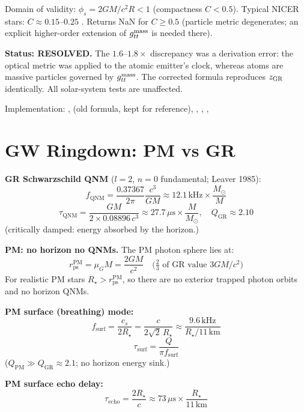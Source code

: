 \documentclass[10pt,twocolumn]{article}
\begin{document}
Domain of validity: $\phi_s = 2GM/c^2 R < 1$ (compactness $C < 0.5$).
Typical NICER stars: $C \approx 0.15$--$0.25$ \checkmark.
Returns NaN for $C \geq 0.5$ (particle metric degenerates; an explicit
higher-order extension of $g_{tt}^{\rm mass}$ is needed there).

\textbf{Status: RESOLVED.}
The $1.6$--$1.8\times$ discrepancy was a derivation error: the optical
metric was applied to the atomic emitter's clock, whereas atoms are
massive particles governed by $g_{tt}^{\rm mass}$.
The corrected formula reproduces $z_{\rm GR}$ identically.
All solar-system tests are unaffected.

Implementation: ,
 (old formula, kept for reference),
,
,
,

\section{GW Ringdown: PM vs GR}

\textbf{GR Schwarzschild QNM} ($l{=}2$, $n{=}0$ fundamental; Leaver 1985):
\[
  f_{\mathrm{QNM}} = \frac{0.37367}{2\pi}\frac{c^3}{GM}
  \approx 12.1\,\mathrm{kHz}\times\frac{M_\odot}{M}
\]
\[
  \tau_{\mathrm{QNM}} = \frac{GM}{2\times0.08896\,c^3}
  \approx 27.7\,\mu\mathrm{s}\times\frac{M}{M_\odot},
  \quad
  Q_{\mathrm{GR}} \approx 2.10
\]
(critically damped: energy absorbed by the horizon.)

\textbf{PM: no horizon \textrightarrow{} no QNMs.}
The PM photon sphere lies at:
\[
  r_{\mathrm{ps}}^{\mathrm{PM}} = \mu_G M = \frac{2GM}{c^2}
  \quad\bigl(\tfrac{2}{3}\text{ of GR value }3GM/c^2\bigr)
\]
For realistic PM stars $R_\star > r_{\mathrm{ps}}^{\mathrm{PM}}$, so there are
no exterior trapped photon orbits and no horizon QNMs.

\textbf{PM surface (breathing) mode:}
\[
  f_{\mathrm{surf}} = \frac{c_s}{2R_\star} = \frac{c}{2\sqrt{2}\,R_\star}
  \approx\frac{9.6\,\mathrm{kHz}}{R_{\star}/\mathrm{11\,km}}
\]
\[
  \tau_{\mathrm{surf}} = \frac{Q}{\pi f_{\mathrm{surf}}}
\]
($Q_{\mathrm{PM}} \gg Q_{\mathrm{GR}}\approx 2.1$; no horizon energy sink.)

\textbf{PM surface echo delay:}
\[
  \tau_{\mathrm{echo}} = \frac{2R_\star}{c}
  \approx 73\,\mu\mathrm{s}\times\frac{R_\star}{11\,\mathrm{km}}
\]
\end{document}
